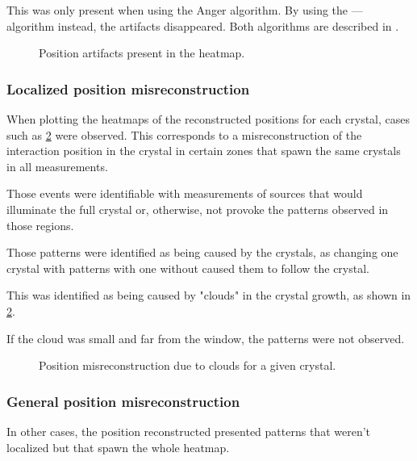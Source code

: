 This was only present when using the Anger algorithm. By using the --- algorithm instead, the artifacts disappeared. Both algorithms are described in \cite{BABIANO20191}.

\begin{figure}[h!]
    \centering
    \caption{Position artifacts present in the heatmap.}%
    \label{fig:PositionArtifactsHeatmap}
\end{figure}

\subsubsection{Localized position misreconstruction}

When plotting the heatmaps of the reconstructed positions for each crystal, cases such as \ref{fig:CloudsHeatmap} were observed. This corresponds to a misreconstruction of the interaction position in the crystal in certain zones that spawn the same crystals in all measurements.

Those events were identifiable with measurements of sources that would illuminate the full crystal or, otherwise, not provoke the patterns observed in those regions.

Those patterns were identified as being caused by the crystals, as changing one crystal with patterns with one without caused them to follow the crystal.

This was identified as being caused by "clouds" in the crystal growth, as shown in \ref{fig:CloudsHeatmap}.

If the cloud was small and far from the window, the patterns were not observed.

\begin{figure}[h!]
    \centering
    \qquad
    \caption{Position misreconstruction due to clouds for a given crystal.}%
    \label{fig:CloudsHeatmap}%
\end{figure}

\subsubsection{General position misreconstruction}

In other cases, the position reconstructed presented patterns that weren't localized but that spawn the whole heatmap.


